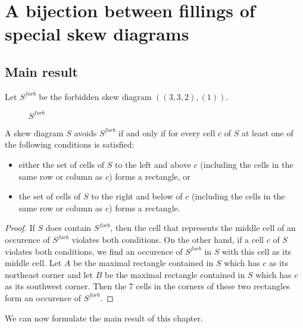 \chapter{A bijection between fillings of special skew diagrams}

\section{Main result}

Let $S^{forb}$ be the forbidden skew diagram $((3,3,2),(1))$.

\begin{figure}[h]
\centering
{}
\caption{$S^{forb}$}
\end{figure}

\begin{lemma} \label{lemma_forb_rec}
A skew diagram $S$ avoids $S^{forb}$ if and only if for every cell $c$ of $S$ at least one
of the following conditions is satisfied:
\begin{itemize}
\item
either the set
of cells of $S$ to the left and above $c$ (including the cells in the same row or column as $c$)
forms a rectangle, or 
\item the set of cells of $S$ to the right and below of $c$ (including the cells in the same row or column
as $c$) forms a rectangle.
\end{itemize}
\end{lemma}
\begin{proof}
If $S$ does contain $S^{forb}$, then the cell that represents the middle cell of an occurence of $S^{forb}$ violates both conditions.
On the other hand, if a cell $c$ of $S$ violates both conditions, we find an occurence of $S^{forb}$ in $S$ with this cell as its middle cell.
Let $A$ be the maximal rectangle contained in $S$ which has $c$ as its northeast corner and let $B$ be the maximal rectangle contained
in $S$ which has $c$ as its southwest corner. Then the 7 cells in the corners of these two rectangles form an occurence of $S^{forb}$.
\end{proof}

We can now formulate the main result of this chapter.


